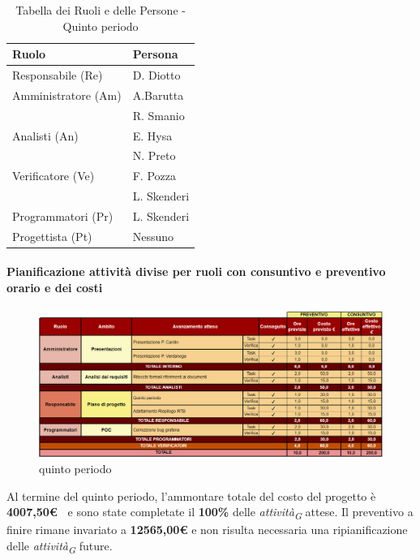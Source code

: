 \begin{table}[H]
    \centering
    \begin{tabular}{|L{4cm}|L{2cm}|}
    \hline
    \textbf{Ruolo} & \textbf{Persona} \\
    \hline
    \hline
    Responsabile (Re)   & D. Diotto \\
    \hline
    Amministratore (Am) & A.Barutta  \\
                        & R. Smanio \\
    \hline
    Analisti (An)       & E. Hysa \\
                        & N. Preto \\
    \hline
    Verificatore (Ve)   & F. Pozza \\
                        & L. Skenderi\\
     \hline
    Programmatori (Pr)  & L. Skenderi \\    
    \hline
    Progettista (Pt)    & Nessuno \\
    \hline
    \end{tabular}
    \caption{Tabella dei Ruoli e delle Persone - Quinto periodo}
    \label{tab:Ruoli_persone_5}
    \end{table}

\newpage
\paragraph{Pianificazione attività divise per ruoli con consuntivo e preventivo orario e dei costi}

\begin{figure}[H]
    \centering
    \includegraphics[width=\linewidth, height=0.9\textheight, keepaspectratio]{../Images/periodo5.PNG}
    \caption{quinto periodo}
    \label{fig:Quinto_periodo}
\end{figure}

\vspace{1cm}

Al termine del quinto periodo, l'ammontare totale del costo del progetto è \textbf{4007,50\euro\ } e sono state completate il \textbf{100\%} delle \textit{attività}\textsubscript{\textit{G}} attese.
Il preventivo a finire rimane invariato a \textbf{12565,00€} e non risulta necessaria una ripianificazione delle \textit{attività}\textsubscript{\textit{G}} future.

